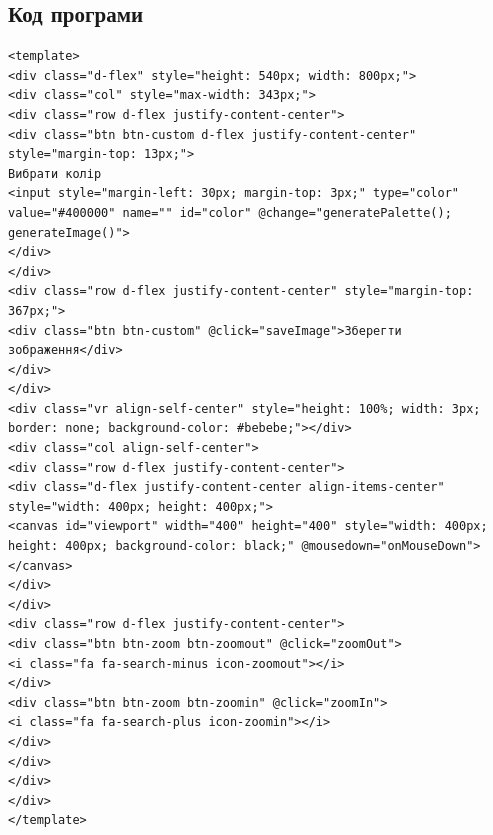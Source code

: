 \documentclass[oneside,14pt]{extarticle}
\begin{document}
\begin{normalsize}
	\subsection{Код програми}
	\begin{tiny}
		\begin{lstlisting}
<template>
<div class="d-flex" style="height: 540px; width: 800px;">
<div class="col" style="max-width: 343px;">
<div class="row d-flex justify-content-center">
<div class="btn btn-custom d-flex justify-content-center" style="margin-top: 13px;">
Вибрати колір
<input style="margin-left: 30px; margin-top: 3px;" type="color" value="#400000" name="" id="color" @change="generatePalette(); generateImage()">
</div>
</div>
<div class="row d-flex justify-content-center" style="margin-top: 367px;">
<div class="btn btn-custom" @click="saveImage">Зберегти зображення</div>
</div>
</div>
<div class="vr align-self-center" style="height: 100%; width: 3px; border: none; background-color: #bebebe;"></div>
<div class="col align-self-center">
<div class="row d-flex justify-content-center">
<div class="d-flex justify-content-center align-items-center" style="width: 400px; height: 400px;">
<canvas id="viewport" width="400" height="400" style="width: 400px; height: 400px; background-color: black;" @mousedown="onMouseDown"></canvas>
</div>
</div>
<div class="row d-flex justify-content-center">
<div class="btn btn-zoom btn-zoomout" @click="zoomOut">
<i class="fa fa-search-minus icon-zoomout"></i>
</div>
<div class="btn btn-zoom btn-zoomin" @click="zoomIn">
<i class="fa fa-search-plus icon-zoomin"></i>
</div>
</div>
</div>
</div>
</template>


\end{lstlisting}
\end{tiny}
\end{normalsize}
\end{document}
